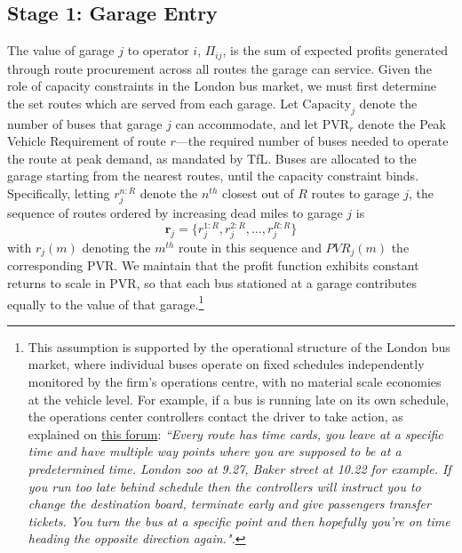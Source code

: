\documentclass[12pt]{article}
\begin{document}
\subsection{Stage 1: Garage Entry}\label{SS:entry}
The value of garage $j$ to operator $i$, $\Pi_{ij}$, is the sum of expected 
profits generated through route procurement across all routes the garage can 
service. Given the role of capacity constraints in the London bus market, we 
must first determine the set routes which are served from each garage. Let $\text{Capacity}_{j}$ 
denote the number of buses that garage $j$ can accommodate, and let 
$\text{PVR}_{r}$ denote the Peak Vehicle Requirement of route $r$---the required 
number of buses needed to operate the route at peak demand, as mandated by TfL. Buses are allocated 
to the garage starting from the nearest routes, until the capacity constraint 
binds. Specifically, letting $r_j^{n:R}$ denote the $n^{th}$ closest out of 
$R$ routes to garage $j$, the sequence of routes ordered by increasing dead 
miles to garage $j$ is
\begin{equation}\label{eq:assignment_buses}
\mathbf{r}_j = \{r_j^{1:R},r_{j}^{2:R},\dots,r_j^{R:R}\}
\end{equation}
with $r_j(m)$ denoting the $m^{th}$ route in this sequence and $PVR_j(m)$ the 
corresponding PVR. We maintain that the profit function exhibits constant 
returns to scale in PVR, so that each bus stationed at a garage contributes 
equally to the value of that garage.\footnote{This assumption is supported by 
the operational structure of the London bus market, where individual buses 
operate on fixed schedules independently monitored by the firm's operations 
centre, with no material scale economies at the vehicle level. For example, if a bus is running late on its own schedule, the operations center controllers contact the driver to take action, as explained on \href{https://www.reddit.com/r/london/comments/15n71jf/bus_drivers_of_london_how_does_the_job_work/}{this forum}: \emph{``Every route has time cards, you leave at a specific time and have multiple way points where you are supposed to be at a predetermined time. London zoo at 9.27, Baker street at 10.22 for example. If you run too late behind schedule then the controllers will instruct you to change the destination board, terminate early and give passengers transfer tickets. You turn the bus at a specific point and then hopefully you’re on time heading the opposite direction again.".}}
\end{document}
